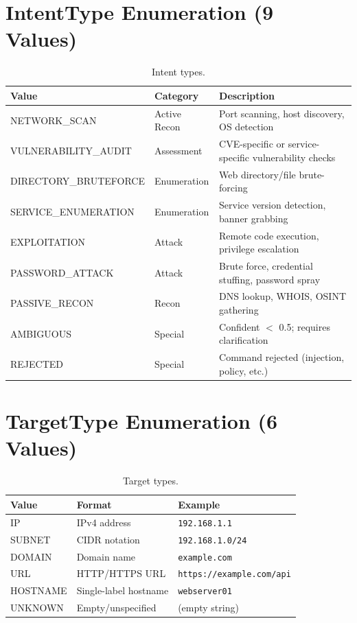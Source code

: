 \documentclass[10pt,journal,onecolumn]{IEEEtran}
\begin{document}
\section{IntentType Enumeration (9 Values)}
\begin{table}[t]
\caption{Intent types.}
\label{tab:appA}
\begin{tabularx}{\textwidth}{>{\ttfamily}l X >{\raggedright\arraybackslash}p{}}
\toprule
\textbf{Value} & \textbf{Category} & \textbf{Description}\\
\midrule
NETWORK\_SCAN & Active Recon & Port scanning, host discovery, OS detection\\
VULNERABILITY\_AUDIT & Assessment & CVE-specific or service-specific vulnerability checks\\
DIRECTORY\_BRUTEFORCE & Enumeration & Web directory/file brute-forcing\\
SERVICE\_ENUMERATION & Enumeration & Service version detection, banner grabbing\\
EXPLOITATION & Attack & Remote code execution, privilege escalation\\
PASSWORD\_ATTACK & Attack & Brute force, credential stuffing, password spray\\
PASSIVE\_RECON & Recon & DNS lookup, WHOIS, OSINT gathering\\
AMBIGUOUS & Special & Confident $<$ 0.5; requires clarification\\
REJECTED & Special & Command rejected (injection, policy, etc.)\\
\bottomrule
\end{tabularx}
\end{table}

\section{TargetType Enumeration (6 Values)}
\begin{table}[t]
\caption{Target types.}
\label{tab:appB}
\begin{tabularx}{\textwidth}{>{\ttfamily}l X X}
\toprule
\textbf{Value} & \textbf{Format} & \textbf{Example}\\
\midrule
IP & IPv4 address & \texttt{192.168.1.1}\\
SUBNET & CIDR notation & \texttt{192.168.1.0/24}\\
DOMAIN & Domain name & \texttt{example.com}\\
URL & HTTP/HTTPS URL & \texttt{https://example.com/api}\\
HOSTNAME & Single-label hostname & \texttt{webserver01}\\
UNKNOWN & Empty/unspecified & (empty string)\\
\bottomrule
\end{tabularx}
\end{table}
\end{document}

